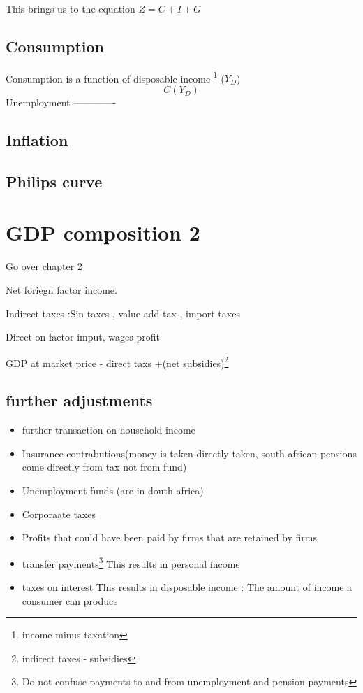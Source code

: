 \documentclass[]{article}
\providecommand{\tightlist}{%
  \setlength{\itemsep}{0pt}\setlength{\parskip}{0pt}}
\begin{document}
This brings us to the equation \(Z = C + I + G\)

\hypertarget{consumption}{%
\subsection{Consumption}\label{consumption}}

Consumption is a function of disposable income \footnote{income minus
  taxation} (\(Y_D\)) \[ C(Y_D) \] Unemployment -------------

\hypertarget{inflation}{%
\subsection{Inflation}\label{inflation}}

\hypertarget{philips-curve}{%
\subsection{Philips curve}\label{philips-curve}}

\hypertarget{gdp-composition-2}{%
\section{GDP composition 2}\label{gdp-composition-2}}

Go over chapter 2

Net foriegn factor income.

Indirect taxes :Sin taxes , value add tax , import taxes

\begin{description}
\tightlist
\item[Directs taxes]
Direct on factor imput, wages profit
\end{description}

GDP at market price - direct taxs +(net subsidies)\footnote{indirect
  taxes - subsidies}

\hypertarget{further-adjustments}{%
\subsection{further adjustments}\label{further-adjustments}}

\begin{itemize}
\tightlist
\item
  further transaction on household income
\item
  Insurance contrabutions(money is taken directly taken, south african
  pensions come directly from tax not from fund)
\item
  Unemployment funds (are in douth africa)
\item
  Corporaate taxes
\item
  Profits that could have been paid by firms that are retained by firms
\item
  transfer payments\footnote{Do not confuse payments to and from
    unemployment and pension payments} This results in personal income
\item
  taxes on interest This results in disposable income : The amount of
  income a consumer can produce
\end{itemize}
\end{document}
